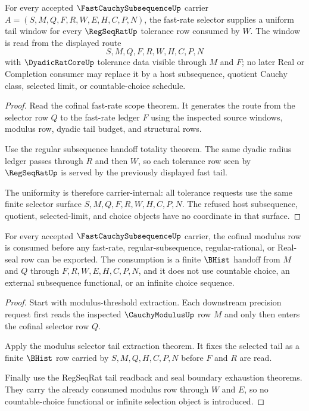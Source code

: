 \begin{theorem}
\label{thm:fast-cauchy-subsequence-uniform-tail-window}
For every accepted $\FastCauchySubsequenceUp$ carrier $A=(S,M,Q,F,R,W,E,H,C,P,N)$, the fast-rate selector supplies a uniform tail window for every $\RegSeqRatUp$ tolerance row consumed by $W$. The window is read from the displayed route
$$
S,M,Q,F,R,W,H,C,P,N
$$
with $\DyadicRatCoreUp$ tolerance data visible through $M$ and $F$; no later Real or Completion consumer may replace it by a host subsequence, quotient Cauchy class, selected limit, or countable-choice schedule.
\end{theorem}
\begin{proof}
Read the cofinal fast-rate scope theorem. It generates the route from the selector row $Q$ to the fast-rate ledger $F$ using the inspected source windows, modulus row, dyadic tail budget, and structural rows.

Use the regular subsequence handoff totality theorem. The same dyadic radius ledger passes through $R$ and then $W$, so each tolerance row seen by $\RegSeqRatUp$ is served by the previously displayed fast tail.

The uniformity is therefore carrier-internal: all tolerance requests use the same finite selector surface $S,M,Q,F,R,W,H,C,P,N$. The refused host subsequence, quotient, selected-limit, and choice objects have no coordinate in that surface.
\end{proof}

\begin{theorem}
\label{thm:fast-cauchy-subsequence-cofinal-modulus-consumption}
For every accepted $\FastCauchySubsequenceUp$ carrier, the cofinal modulus row is consumed before any fast-rate, regular-subsequence, regular-rational, or Real-seal row can be exported. The consumption is a finite $\BHist$ handoff from $M$ and $Q$ through $F,R,W,E,H,C,P,N$, and it does not use countable choice, an external subsequence functional, or an infinite choice sequence.
\end{theorem}
\begin{proof}
Start with modulus-threshold extraction. Each downstream precision request first reads the inspected $\CauchyModulusUp$ row $M$ and only then enters the cofinal selector row $Q$.

Apply the modulus selector tail extraction theorem. It fixes the selected tail as a finite $\BHist$ row carried by $S,M,Q,H,C,P,N$ before $F$ and $R$ are read.

Finally use the RegSeqRat tail readback and seal boundary exhaustion theorems. They carry the already consumed modulus row through $W$ and $E$, so no countable-choice functional or infinite selection object is introduced.
\end{proof}


